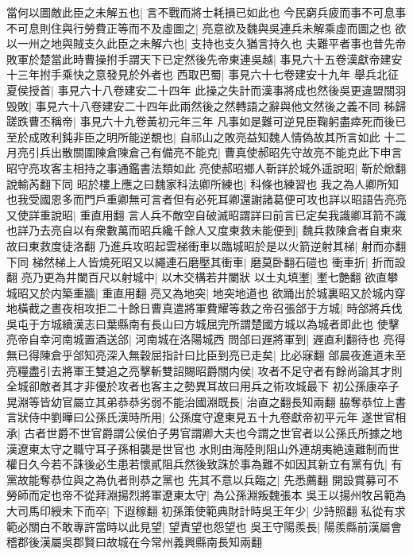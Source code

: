 當何以圖敵此臣之未解五也|{
	言不戰而將士耗損已如此也}
今民窮兵疲而事不可息事不可息則住與行勞費正等而不及虛圖之|{
	亮意欲及魏與吳連兵未解乘虛而圖之也}
欲以一州之地與賊支久此臣之未解六也|{
	支持也支久猶言持久也}
夫難平者事也昔先帝敗軍於楚當此時曹操拊手謂天下已定然後先帝東連吳越|{
	事見六十五卷漢獻帝建安十三年拊手乘快之意發見於外者也}
西取巴蜀|{
	事見六十七卷建安十九年}
舉兵北征夏侯授首|{
	事見六十八卷建安二十四年}
此操之失計而漢事將成也然後吳更違盟關羽毁敗|{
	事見六十八卷建安二十四年此兩然後之然轉語之辭與他文然後之義不同}
秭歸蹉跌曹丕稱帝|{
	事見六十九卷黃初元年三年}
凡事如是難可逆見臣鞠躬盡瘁死而後已至於成敗利鈍非臣之明所能逆覩也|{
	自祁山之敗亮益知魏人情偽故其所言如此}
十二月亮引兵出散關圍陳倉陳倉己有備亮不能克|{
	曹真使郝昭先守故亮不能克此下申言昭守亮攻客主相持之事通鑑書法類如此}
亮使郝昭鄉人靳詳於城外遥說昭|{
	靳於焮翻說輸芮翻下同}
昭於樓上應之曰魏家科法卿所練也|{
	科條也練習也}
我之為人卿所知也我受國恩多而門戶重卿無可言者但有必死耳卿還謝諸葛便可攻也詳以昭語告亮亮又使詳重說昭|{
	重直用翻}
言人兵不敵空自破滅昭謂詳曰前言已定矣我識卿耳箭不識也詳乃去亮自以有衆數萬而昭兵纔千餘人又度東救未能便到|{
	魏兵救陳倉者自東來故曰東救度徒洛翻}
乃進兵攻昭起雲梯衝車以臨城昭於是以火箭逆射其梯|{
	射而亦翻下同}
梯然梯上人皆燒死昭又以繩連石磨壓其衝車|{
	磨莫卧翻石磑也}
衝車折|{
	折而設翻}
亮乃更為井闌百尺以射城中|{
	以木交構若井闌狀}
以土丸填壍|{
	壍七艶翻}
欲直攀城昭又於内築重牆|{
	重直用翻}
亮又為地突|{
	地突地道也}
欲踊出於城裏昭又於城内穿地橫截之晝夜相攻拒二十餘日曹真遣將軍費耀等救之帝召張郃于方城|{
	時郃將兵伐吳屯于方城續漢志曰葉縣南有長山曰方城屈完所謂楚國方城以為城者即此也}
使擊亮帝自幸河南城置酒送郃|{
	河南城在洛陽城西}
問郃曰遟將軍到|{
	遟直利翻待也}
亮得無已得陳倉乎郃知亮深入無穀屈指計曰比臣到亮已走矣|{
	比必寐翻}
郃晨夜進道未至亮糧盡引去將軍王雙追之亮擊斬雙詔賜昭爵關内侯|{
	攻者不足守者有餘尚論其才則全城卻敵者其才非優於攻者也客主之勢異耳故曰用兵之術攻城最下}
初公孫康卒子晃淵等皆幼官屬立其弟恭恭劣弱不能治國淵既長|{
	治直之翻長知兩翻}
脇奪恭位上書言狀侍中劉曄曰公孫氏漢時所用|{
	公孫度守遼東見五十九卷獻帝初平元年}
遂世官相承|{
	古者世爵不世官爵謂公侯伯子男官謂卿大夫也今謂之世官者以公孫氏所據之地漢遼東太守之職守耳子孫相襲是世官也}
水則由海陸則阻山外連胡夷絶遠難制而世權日久今若不誅後必生患若懷貳阻兵然後致誅於事為難不如因其新立有黨有仇|{
	有黨故能奪恭位與之為仇者則恭之黨也}
先其不意以兵臨之|{
	先悉薦翻}
開設賞募可不勞師而定也帝不從拜淵揚烈將軍遼東太守|{
	為公孫淵叛魏張本}
吳王以揚州牧呂範為大司馬印綬未下而卒|{
	下遐稼翻}
初孫策使範典財計時吳王年少|{
	少詩照翻}
私從有求範必關白不敢專許當時以此見望|{
	望責望也怨望也}
吳王守陽羨長|{
	陽羨縣前漢屬會稽郡後漢屬吳郡賢曰故城在今常州義興縣南長知兩翻}
